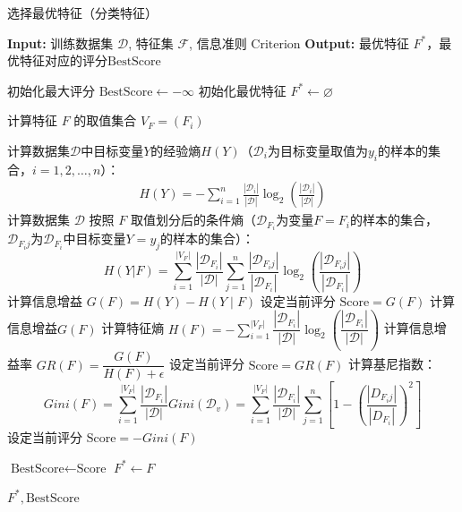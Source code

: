 \begin{algorithm}
	\caption{选择最优特征（分类特征）}
	\begin{algorithmic}[1]
		\State \textbf{Input:} 训练数据集 \(\mathcal{D}\), 特征集 \(\mathcal{F}\), 信息准则 \(\text{Criterion}\)
		\State \textbf{Output:} 最优特征 \(F^*\)，最优特征对应的评分$\text{BestScore}$
		
		\State 初始化最大评分 \(\text{BestScore} \gets -\infty\)
		\State 初始化最优特征 \(F^* \gets \varnothing\)
		
		\State 计算特征 \(F\) 的取值集合 \(V_F=(F_i)\)

		\State 计算数据集$\mathcal{D}$中目标变量$Y$的经验熵$H(Y)$（$\mathcal{D}_{i}$为目标变量取值为$y_i$的样本的集合，$i=1,2,\dots,n$）：
		\begin{align*}
			H(Y)=-\sum_{i=1}^n\frac{|\mathcal{D}_i|}{|\mathcal{D}|}\log_2\left(\frac{|\mathcal{D}_i|}{|\mathcal{D}|}\right)
		\end{align*}
		\State 计算数据集 \(\mathcal{D}\) 按照 \(F\) 取值划分后的条件熵（$\mathcal{D}_{F_i}$为变量$F=F_i$的样本的集合，$\mathcal{D}_{F_ij}$为$\mathcal{D}_{F_i}$中目标变量$Y=y_j$的样本的集合）：
		\begin{equation*}
			H(Y|F)=\sum_{i=1}^{|V_F|}\frac{|\mathcal{D}_{F_i}|}{|\mathcal{D}|}\sum_{j=1}^{n}\frac{|\mathcal{D}_{F_ij}|}{|\mathcal{D}_{F_i}|}\log_2\left(\frac{|\mathcal{D}_{F_ij}|}{|\mathcal{D}_{F_i}|}\right)
		\end{equation*}
		\State 计算信息增益 \(G(F) = H(Y) - H(Y \mid F)\)
		\State 设定当前评分 \(\text{Score} = G(F)\)
		\State 计算信息增益$G(F)$
		\State 计算特征熵 \(H(F)=-\sum\limits_{i=1}^{|V_F|}\dfrac{|\mathcal{D}_{F_i}|}{|\mathcal{D}|}\log_2\left(\dfrac{|\mathcal{D}_{F_i}|}{|\mathcal{D}|}\right)\)
		\State 计算信息增益率 \(GR(F) = \dfrac{G(F)}{H(F) + \epsilon}\)
		\State 设定当前评分 \(\text{Score} = GR(F)\)
		\State 计算基尼指数：
		\begin{equation*}
			Gini(F) = \sum_{i=1}^{|V_F|} \frac{|\mathcal{D}_{F_i}|}{|\mathcal{D}|} Gini(\mathcal{D}_v)=\sum_{i=1}^{|V_F|} \frac{|\mathcal{D}_{F_i}|}{|\mathcal{D}|}\sum_{j=1}^{n}\left[1-\left(\frac{|D_{F_ij}|}{|D_{F_i}|}\right)^2\right]
		\end{equation*} 
		\State 设定当前评分 \(\text{Score} = -Gini(F)\) 
		\EndIf
		
		\State \(\text{BestScore} \gets \text{Score}\)
		\State \(F^* \gets F\)
		\EndIf
		\EndFor
		
		\State \Return \(F^*, \text{BestScore}\)
		\EndFunction
	\end{algorithmic}
\end{algorithm}

